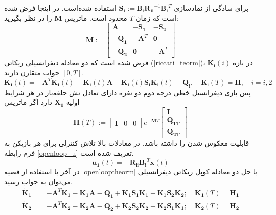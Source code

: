 برای سادگی از نمادسازی 
$\boldsymbol{S_i} := \boldsymbol{B_iR_{ii}}^{-1}\boldsymbol{B_i}^T$
استفاده شده‌است. در اینجا فرض شده است که زمان $T$ محدود است.
 \label{openlooptheorm}
ماتریس
$\boldsymbol{M}$ را در نظر بگیرید:
\begin{equation}
	\boldsymbol{M} :=
	\begin{bmatrix}
		\boldsymbol{A} & -\boldsymbol{S_1} & -\boldsymbol{S_2}\\
		-\boldsymbol{Q_1} & -\boldsymbol{A}^T& \boldsymbol{0}\\
		-\boldsymbol{Q_2} & \boldsymbol{0} & -\boldsymbol{A}^T
	\end{bmatrix}
\end{equation}
فرض شده ‌است که دو معادله دیفرانسیلی ریکاتی
(\ref{riccati_teorm})، $\boldsymbol{K_i}(i)$ 
 در بازه
$[0, T]$
جواب متقارن دارند.
\begin{equation}\label{riccati_teorm}
	\boldsymbol{\dot{K}_i}(t) = -\boldsymbol{A}^T\boldsymbol{K_i}(t)-\boldsymbol{K_i}(t)\boldsymbol{A}+\boldsymbol{K_i}(t)\boldsymbol{S_iK_i}(t)-\boldsymbol{Q_i},\quad \boldsymbol{K_i}(T) = \boldsymbol{H},\quad i = i, 2
\end{equation}
\newpage
پس بازی دیفرانسیل خطی درجه دوم دو نفره دارای تعادل نش حلقه‌باز در هر شرایط اولیه $\boldsymbol{X_0}
$
دارد اگر ماتریس
\begin{equation}
	\boldsymbol{H}(T) := \begin{bmatrix}
		\boldsymbol{I}&0&0
	\end{bmatrix}
e^{-\boldsymbol{M}T}
\begin{bmatrix}
	\boldsymbol{I}
	\\ \boldsymbol{Q_{1T}}
	\\ \boldsymbol{Q_{2T}}
\end{bmatrix}
\end{equation}
قابلیت معکوس شدن را  داشته‌ باشد.
در معادلات بالا تلاش کنترلی برای هر بازیکن به فرم رابطه \ref{openloop_u} تعریف شده است.
\begin{equation}\label{openloop_u}
	\boldsymbol{u_1}(t) = -\boldsymbol{R_{ii}}\boldsymbol{B_i}^T\boldsymbol{x}(t)
\end{equation}
در آخر با استفاده از قضیه
 \ref{openlooptheorm}
با حل دو معادله کوپل ریکاتی دیفرانسیلی می‌توان به جواب رسید.
\begin{align}
	\boldsymbol{\dot{K}_1} &= -\boldsymbol{A}^T\boldsymbol{K_1} - \boldsymbol{K_1A} - \boldsymbol{Q_1} +\boldsymbol{K_1S_1K_1} + \boldsymbol{K_1S_2K_2};\quad \boldsymbol{K_1}(T) = \boldsymbol{H_1}\\
	\boldsymbol{\dot{K}_2} &= -\boldsymbol{A}^T\boldsymbol{K_2} - \boldsymbol{K_2A} - \boldsymbol{Q_2} +\boldsymbol{K_2S_2K_2} + \boldsymbol{K_2S_1K_1};\quad \boldsymbol{K_2}(T) = \boldsymbol{H_2}
\end{align}

